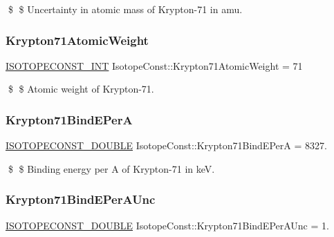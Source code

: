 \$ \$ Uncertainty in atomic mass of Krypton-\/71 in amu. \mbox{\label{group___isotope_const-_krypton-_kr71_ga05b7b25b3899053052d1b1aff716d26f}} 
\subsubsection{\texorpdfstring{Krypton71\+Atomic\+Weight}{Krypton71AtomicWeight}}
{\footnotesize\ttfamily \mbox{\hyperlink{group___isotope_const-_macros_ga5f18360b3e99483a35c32d789e62621c}{I\+S\+O\+T\+O\+P\+E\+C\+O\+N\+S\+T\+\_\+\+I\+NT}} Isotope\+Const\+::\+Krypton71\+Atomic\+Weight = 71}

\$ \$ Atomic weight of Krypton-\/71. \mbox{\label{group___isotope_const-_krypton-_kr71_gaf903a28a63fadc3ec5b9c4b80a86006e}} 
\subsubsection{\texorpdfstring{Krypton71\+Bind\+E\+PerA}{Krypton71BindEPerA}}
{\footnotesize\ttfamily \mbox{\hyperlink{group___isotope_const-_macros_ga8f45a7272ce02c0b4c65c44636ed719a}{I\+S\+O\+T\+O\+P\+E\+C\+O\+N\+S\+T\+\_\+\+D\+O\+U\+B\+LE}} Isotope\+Const\+::\+Krypton71\+Bind\+E\+PerA = 8327.}

\$ \$ Binding energy per A of Krypton-\/71 in keV. \mbox{\label{group___isotope_const-_krypton-_kr71_gad100c5cde748a990b288e2faa513e37c}} 
\subsubsection{\texorpdfstring{Krypton71\+Bind\+E\+Per\+A\+Unc}{Krypton71BindEPerAUnc}}
{\footnotesize\ttfamily \mbox{\hyperlink{group___isotope_const-_macros_ga8f45a7272ce02c0b4c65c44636ed719a}{I\+S\+O\+T\+O\+P\+E\+C\+O\+N\+S\+T\+\_\+\+D\+O\+U\+B\+LE}} Isotope\+Const\+::\+Krypton71\+Bind\+E\+Per\+A\+Unc = 1.}


